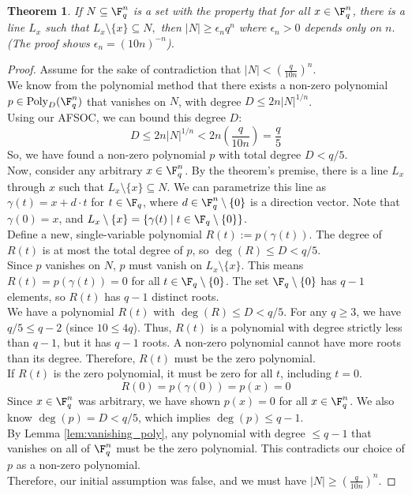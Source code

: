 \documentclass[a4paper]{article}
\newtheorem{thm}{Theorem}[section]
\begin{document}
\begin{thm}
    If $N\subseteq \F_q^n$ is a set with the property that for all $x\in \F_q^n$, there is a line $L_x$ such that $L_x\setminus \{x\}\subseteq N,$ then $|N|\geq \epsilon_nq^n$ where $\epsilon_n>0$ depends only on $n.$ 
    (The proof shows $\epsilon_n = (10n)^{-n}$).
\end{thm}
\begin{proof}
    Assume for the sake of contradiction that $|N| < \left( \frac{q}{10n} \right)^n$.\\[1ex]
    We know from the polynomial method that there exists a non-zero polynomial $p \in \text{Poly}_D(\F_q^n)$ that vanishes on $N$, with degree $D \le 2n|N|^{1/n}$.\\[1ex]
    Using our AFSOC, we can bound this degree $D$:
    $$D \le 2n|N|^{1/n} < 2n \left( \frac{q}{10n} \right) = \frac{q}{5}$$
    So, we have found a non-zero polynomial $p$ with total degree $D < q/5$.\\[1ex]
    Now, consider any arbitrary $x \in \F_q^n$. By the theorem's premise, there is a line $L_x$ through $x$ such that $L_x \setminus \{x\} \subseteq N$. We can parametrize this line as $\gamma(t) = x + d \cdot t$ for $t \in \F_q$, where $d \in \F_q^n \setminus \{0\}$ is a direction vector.
    Note that $\gamma(0) = x$, and $L_x \setminus \{x\} = \{\gamma(t) \mid t \in \F_q \setminus \{0\}\}$.\\[1ex]
    Define a new, single-variable polynomial $R(t) := p(\gamma(t))$.
    The degree of $R(t)$ is at most the total degree of $p$, so $\deg(R) \le D < q/5$.\\[1ex]
    Since $p$ vanishes on $N$, $p$ must vanish on $L_x \setminus \{x\}$. This means $R(t) = p(\gamma(t)) = 0$ for all $t \in \F_q \setminus \{0\}$.
    The set $\F_q \setminus \{0\}$ has $q-1$ elements, so $R(t)$ has $q-1$ distinct roots.\\[1ex]
    We have a polynomial $R(t)$ with $\deg(R) \le D < q/5$. For any $q \ge 3$, we have $q/5 \le q-2$ (since $10 \le 4q$).
    Thus, $R(t)$ is a polynomial with degree strictly less than $q-1$, but it has $q-1$ roots.
    A non-zero polynomial cannot have more roots than its degree. Therefore, $R(t)$ must be the zero polynomial.\\[1ex]
    If $R(t)$ is the zero polynomial, it must be zero for all $t$, including $t=0$.
    $$R(0) = p(\gamma(0)) = p(x) = 0$$
    Since $x \in \F_q^n$ was arbitrary, we have shown $p(x) = 0$ for all $x \in \F_q^n$.
    We also know $\deg(p) = D < q/5$, which implies $\deg(p) \le q-1$.\\[1ex]
    By Lemma \ref{lem:vanishing_poly}, any polynomial with degree $\le q-1$ that vanishes on all of $\F_q^n$ must be the zero polynomial.
    This contradicts our choice of $p$ as a non-zero polynomial.\\[1ex]
    Therefore, our initial assumption was false, and we must have $|N| \ge \left( \frac{q}{10n} \right)^n$.
\end{proof}
\end{document}
